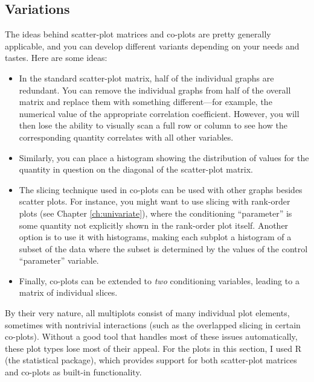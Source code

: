 \vspace*{-6pt}
\subsection{Variations}

The ideas behind scatter-plot matrices and co-plots are pretty 
generally applicable, and you can develop different variants
depending on your needs and tastes. Here are some ideas:

\begin{itemize}
\item In the standard scatter-plot matrix, half of the individual
  graphs are redundant. You can remove the individual graphs from half
  of the overall matrix and replace them with something
  different---for example, the numerical\vadjust{\pagebreak} value of the appropriate
  correlation coefficient.  However, you will then lose the ability to
  visually scan a full row or column to see how the corresponding
  quantity correlates with all other variables.
\item Similarly, you can place a histogram showing the distribution
  of values for the quantity in question on the diagonal of the 
  scatter-plot matrix.
\item The slicing technique used in co-plots can be used with other
  graphs besides scatter plots. For instance, you might want to use
  slicing with rank-order plots (see Chapter \ref{ch:univariate}),
  where the conditioning ``parameter'' is some quantity not explicitly
  shown in the rank-order plot itself. Another option is to use it
  with histograms, making each subplot a histogram of a subset of the
  data where the subset is determined by the values of the control
  ``parameter'' variable.
\item Finally, co-plots can be extended to \emph{two} conditioning
  variables, leading to a matrix of individual slices.
\end{itemize}

By their very nature, all multiplots consist of many individual plot
elements, sometimes with nontrivial interactions (such as\vadjust{\pagebreak} the
overlapped slicing in certain co-plots). Without a good tool that
handles most of these issues automatically, these plot types lose
most of their appeal. For the plots in this section, I used R (the
statistical package), which provides support for both scatter-plot
matrices and co-plots as built-in functionality.

